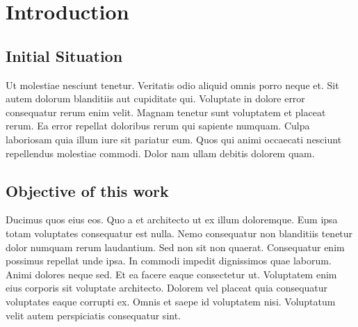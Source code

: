 \newpage
\section{Introduction}

\subsection{Initial Situation}

Ut molestiae nesciunt tenetur. Veritatis odio aliquid omnis porro neque et. Sit autem dolorum blanditiis aut cupiditate qui.
Voluptate in dolore error consequatur rerum enim velit. Magnam tenetur sunt voluptatem et placeat rerum. Ea error repellat doloribus rerum qui sapiente numquam. Culpa laboriosam quia illum iure sit pariatur eum. Quos qui animi occaecati nesciunt repellendus molestiae commodi. Dolor nam ullam debitis dolorem quam.

\subsection{Objective of this work}

Ducimus quos eius eos. Quo a et architecto ut ex illum doloremque. Eum ipsa totam voluptates consequatur est nulla. Nemo consequatur non blanditiis tenetur dolor numquam rerum laudantium. Sed non sit non quaerat.
Consequatur enim possimus repellat unde ipsa. In commodi impedit dignissimos quae laborum. Animi dolores neque sed. Et ea facere eaque consectetur ut.
Voluptatem enim eius corporis sit voluptate architecto. Dolorem vel placeat quia consequatur voluptates eaque corrupti ex. Omnis et saepe id voluptatem nisi. Voluptatum velit autem perspiciatis consequatur sint.